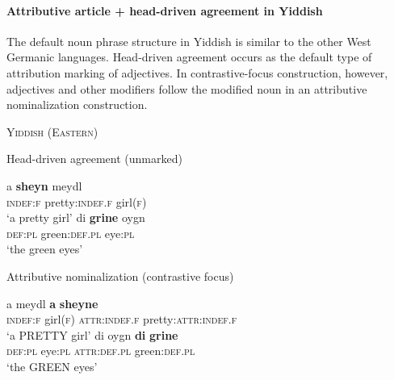 \paragraph{Attributive article + head-driven agreement in Yiddish} \label{yiddish synchr}
The default noun phrase structure in Yiddish is similar to the other West Germanic languages. Head-driven agreement occurs as the default type of attribution marking of adjectives. In contrastive-focus construction, however, adjectives and other modifiers follow the modified noun in an attributive nominalization construction.
\begin{exe}
\ex \textsc{Yiddish (Eastern)} \cite[96]{jacobs-etal1994}
\begin{xlist}
\ex Head-driven agreement (unmarked)
\begin{xlist}
\ex 
\gll	a \textbf{sheyn} meydl\\
	\textsc{indef:f} pretty:\textsc{indef.f} girl\textsc{(f)}\\
\glt	‘a pretty girl’
\ex
\gll	di \textbf{grine} oygn\\
	\textsc{def:pl} green:\textsc{def.pl} eye:\textsc{pl}\\
\glt	‘the green eyes’
\end{xlist}
\ex Attributive nominalization (contrastive focus)
\begin{xlist}
\ex
\gll	a meydl \textbf{a} \textbf{sheyne}\\
	\textsc{indef:f} girl\textsc{(f)} \textsc{attr:indef.f} pretty:\textsc{attr:indef.f}\\
\glt	‘a PRETTY girl’
\ex
\gll	di oygn \textbf{di} \textbf{grine}\\
	\textsc{def:pl} eye:\textsc{pl} \textsc{attr:def.pl} green:\textsc{def.pl} \\
\glt	‘the GREEN eyes’
\end{xlist}
\end{xlist}
\end{exe}

